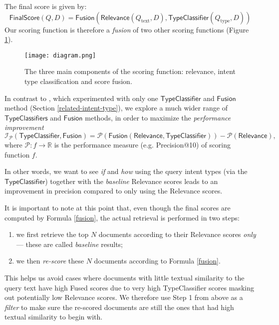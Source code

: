 The final score is given by:
\begin{equation}\label{fusion}
  \textsf{FinalScore}(Q, D) = \textsf{Fusion}\left(\textsf{Relevance}(Q_{\text{text}}, D), \textsf{TypeClassifier}(Q_{\text{type}}, D)\right)
\end{equation}
Our scoring function is therefore a \emph{fusion} of two other scoring functions (Figure \ref{diagram}).

\begin{figure}
\centerline{
  \texttt{[image: diagram.png]}
  }
  \caption{The three main components of the scoring function:
  relevance, intent type classification and score fusion.}
  \label{diagram}
\end{figure}

In contrast to \cite{choi, limsi2015, FDUMedSearch}, which experimented with only one
$\textsf{TypeClassifier}$ and $\textsf{Fusion}$ method
(Section \ref{related-intent-type}),
we explore a much wider range of $\textsf{TypeClassifiers}$ and $\textsf{Fusion}$ methods, in order to maximize
the \emph{performance improvement}
\begin{equation}\label{improvement-formula}
   \mathcal{I}_{\mathcal{P}}(\textsf{TypeClassifier}, \textsf{Fusion})
   =\mathcal{P}(\textsf{Fusion}(\textsf{Relevance}, \textsf{TypeClassifier})) - \mathcal{P}(\textsf{Relevance}),
\end{equation}
where $\mathcal{P}: f \rightarrow \mathbb{R}$ is the performance measure (e.g. Precision@10) of scoring function $f$.

In other words, we want to see \emph{if} and \emph{how} using the query intent types (via the
$\textsf{TypeClassifier}$) together with the \emph{baseline} \textsf{Relevance} scores
leads to an improvement in precision compared to only using the \textsf{Relevance} scores.

It is important to note at this point that, even though the final scores are computed by Formula \ref{fusion},
the actual retrieval is performed in two steps:
\begin{enumerate}
 \item we first retrieve the top $N$ documents according to their \textsf{Relevance} scores \emph{only} --- these are called
 \emph{baseline} results;
 \vspace{-0.2cm}
 \item we then \emph{re-score} these $N$ documents according to Formula \ref{fusion}.
\end{enumerate}
This helps us avoid cases where documents with little textual similarity to the query text
have high \textsf{Fused} scores due to very high \textsf{TypeClassifier} scores masking out potentially low \textsf{Relevance} scores.
We therefore use Step 1 from above as a \emph{filter} to make sure the re-scored documents are still the ones that had high textual
similarity to begin with.

